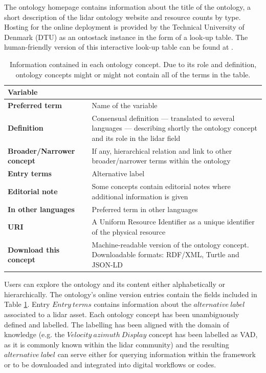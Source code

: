 \documentclass[remotesensing,article,submit,pdftex,moreauthors]{Definitions/mdpi}
\begin{document}
The ontology homepage contains information about the title of the ontology, a short description of the lidar ontology website and resource counts by type. Hosting for the online deployment is provided by the Technical University of Denmark (DTU) as an ontostack instance in the form of a look-up table. The human-friendly version of this interactive look-up table can be found at \cite{}.

\begin{table}[H] 
\caption{Information contained in each ontology concept. Due to its role and definition, ontology concepts might or might not contain all of the terms in the table.\label{Ontology_var}}
{\def\arraystretch{2}\tabcolsep=11pt
\begin{tabularx}{\textwidth}{lX}
\toprule
\toprule
\textbf{Variable}	\\
\midrule
\midrule
\textbf{Preferred term	}	& 	Name of the variable\\
\hline
\textbf{Definition}	& Consensual definition --- translated to several languages --- describing shortly the ontology concept and its role in the lidar field\\
\hline
\textbf{Broader/Narrower concept}	& If any, hierarchical relation and link to other broader/narrower terms within the ontology\\
\hline
\textbf{Entry terms}	& Alternative label\\
\hline
\textbf{Editorial note}	&  Some concepts contain editorial notes where  additional information is given \\
\hline
\textbf{In other languages}	& Preferred term in other languages\\
\hline
\textbf{URI}	& A Uniform Resource Identifier as a unique identifier of the physical resource\\
\hline
\textbf{Download this concept} & Machine-readable version of the ontology concept. Downloadable formats: RDF/XML, Turtle and JSON-LD\\
\bottomrule
\bottomrule
\end{tabularx}
}
\end{table}

Users can explore the ontology and its content either alphabetically or hierarchically. The ontology's online version entries contain the fields included in Table \ref{Ontology_var}. Entry $Entry~terms$ contains information about the $alternative~label$ associated to a lidar asset. Each ontology concept has been unambiguously defined and labelled. The labelling has been aligned with the domain of knowledge (e.g. the $Velocity~azimuth~Display$ concept has been labelled as VAD, as it is commonly known within the lidar community) and the resulting $alternative~label$ can serve either for querying information within the framework or to be downloaded and integrated into digital workflows or codes. 
\end{document}
